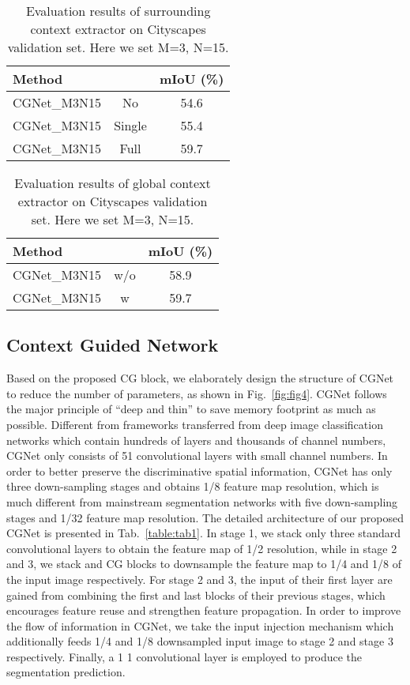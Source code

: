 \documentclass[10pt,twocolumn,letterpaper]{article}
\begin{document}
\begin{table}[t]
\begin{center}
\begin{tabular}{|lcc|}
\hline
Method  & \bf{} & {mIoU (\%)} \\
\hline\hline
CGNet\_M3N15 & No &  54.6 \\
CGNet\_M3N15 & Single & 55.4 \\
CGNet\_M3N15 & Full  &  59.7 \\
\hline
\end{tabular}
\end{center}
\caption{Evaluation results of surrounding context extractor on Cityscapes validation set. Here we set M=3, N=15. }
\label{table:tab2}
\end{table}



\begin{table}[t]
\begin{center}
\begin{tabular}{|lcc|}
\hline
Method  &  & {mIoU (\%)} \\
\hline\hline
CGNet\_M3N15 & w/o &58.9   \\
CGNet\_M3N15 & w   & 59.7 \\
\hline
\end{tabular}
\end{center}
\caption{Evaluation results of global context extractor on Cityscapes validation set. Here we set M=3, N=15. }
\label{table:tab3}
\end{table}
\subsection{Context Guided Network}

Based on the proposed CG block, we elaborately design the structure of CGNet to reduce the number of parameters, as shown in Fig.~\ref{fig:fig4}.
CGNet follows the major principle of ``deep and thin'' to save memory footprint as much as possible. Different from frameworks transferred from deep image classification networks which contain hundreds of layers and thousands of channel numbers, CGNet only consists of 51 convolutional layers with small channel numbers.
In order to better preserve the discriminative spatial information, CGNet has only three down-sampling stages and obtains 1/8 feature map resolution, which is much different from mainstream segmentation networks with five down-sampling stages and 1/32 feature map resolution. The detailed architecture of our proposed CGNet is presented in Tab.~\ref{table:tab1}.
In stage 1, we stack only three standard convolutional layers to obtain the feature map of 1/2 resolution, while in stage 2 and 3, we stack  and  CG blocks to downsample the feature map to 1/4 and 1/8 of the input image respectively. For stage 2 and 3, the input of their first layer are gained from combining the first and last blocks of their previous stages, which encourages feature reuse and strengthen feature propagation. In order to improve the flow of information in CGNet, we take the input injection mechanism which additionally feeds 1/4 and 1/8 downsampled input image to stage 2 and stage 3 respectively. Finally, a 1  1 convolutional layer is employed to produce the segmentation prediction.
\end{document}
